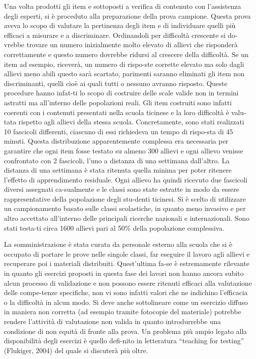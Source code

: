 \documentclass[
]{book}
\begin{document}
Una volta prodotti gli item e sottoposti a verifica di contenuto con l'assistenza degli esperti, si è proceduto alla preparazione della prova campione. Questa prova aveva lo scopo di valutare la pertinenza degli item e di individuare quelli più efficaci a misurare e a discriminare. Ordinandoli per difficoltà crescente si do-vrebbe trovare un numero inizialmente molto elevato di allievi che risponderà correttamente e questo numero dovrebbe ridursi al crescere della difficoltà. Se un item ad esempio, riceverà, un numero di rispo-ste corrette elevato ma solo dagli allievi meno abili questo sarà scartato, parimenti saranno eliminati gli item non discriminanti, quelli cioè ai quali tutti o nessuno avranno risposto. Queste procedure hanno infat-ti lo scopo di costruire delle scale valide non in termini astratti ma all'interno delle popolazioni reali. Gli item costruiti sono infatti coerenti con i contenuti presentati nella scuola ticinese e la loro difficoltà è valu-tata rispetto agli allievi della stessa scuola.
Concretamente, sono stati realizzati 10 fascicoli differenti, ciascuno di essi richiedeva un tempo di rispo-sta di 45 minuti. Questa distribuzione apparentemente complessa era necessaria per garantire che ogni item fosse testato su almeno 300 allievi e ogni allievo venisse confrontato con 2 fascicoli, l'uno a distanza di una settimana dall'altro. La distanza di una settimana è stata ritenuta quella minima per poter ritenere l'effetto di apprendimento residuale. Ogni allievo ha quindi ricevuto due fascicoli diversi assegnati ca-sualmente e le classi sono state estratte in modo da essere rappresentative della popolazione degli stu-denti ticinesi. Si è scelto di utilizzare un campionamento basato sulle classi scolastiche, in quanto meno invasivo e per altro accettato all'interno delle principali ricerche nazionali e internazionali. Sono stati testa-ti circa 1600 allievi pari al 50\% della popolazione complessiva.

La somministrazione è stata curata da personale esterno alla scuola che si è occupato di portare le prove nelle singole classi, far eseguire il lavoro agli allievi e recuperare poi i materiali distribuiti. Quest'ultima fa-se è estremamente rilevante in quanto gli esercizi proposti in questa fase dei lavori non hanno ancora subito alcun processo di validazione e non possono essere ritenuti efficaci alla valutazione delle compe-tenze specifiche, non vi sono infatti valori che ne indichino l'efficacia o la difficoltà in alcun modo. Si deve anche sottolineare come un esercizio diffuso in maniera non corretta (ad esempio tramite fotocopie del materiale) potrebbe rendere l'attività di valutazione non valida in quanto introdurrebbe una condizione di non equità di fronte alla prova. Un problema più ampio legato alla disponibilità degli esercizi è quello defi-nito in letteratura ``teaching for testing'' (Flukiger, 2004) del quale si discuterà più oltre.
\end{document}
